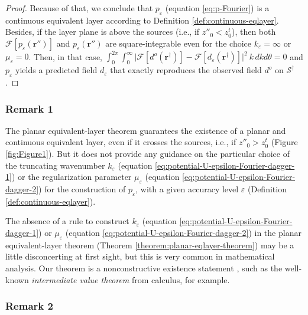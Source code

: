 \documentclass[manuscript,noblind]{geophysics}
\begin{document}
\begin{proof}
		Because of that, we conclude that $p_{\varepsilon}$ (equation \ref{eq:p-Fourier})
		is a continuous equivalent layer according to Definition \ref{def:continuous-eqlayer}. 
		Besides, if the layer plane is above the sources (i.e., if $z''_{0} < z^{t}_{0}$), then both 
		$\mathcal{F} [ p_{\varepsilon}(\mathbf{r}'') ]$ and $p_{\varepsilon}(\mathbf{r}'')$ are square-integrable
		even for the choice $k_{\varepsilon} = \infty$ or $\mu_{\varepsilon} = 0$. Then, in that case, 
		$\int_{0}^{2\pi} \int_{0}^{\infty} 
		\vert \mathcal{F} [ d^{o}(\mathbf{r}^{\dagger}) ] - \mathcal{F} [d_{\varepsilon}(\mathbf{r}^{\dagger}) ] \vert^{2} \: k \, dkd\theta 
		= 0$ and $p_{\varepsilon}$ yields a predicted field $d_{\varepsilon}$ that exactly reproduces the observed field $d^{o}$ 
		on $\mathcal{S}^{\dagger}$.
	\end{proof}
	
	\subsubsection{Remark 1}
	
	The planar equivalent-layer theorem guarantees the existence of a planar and continuous equivalent layer, even if
	it crosses the sources, i.e., if $z''_{0} > z^{t}_{0}$ (Figure \ref{fig:Figure1}).
	But it does not provide any guidance on the particular choice of the 
	truncating wavenumber $k_{\varepsilon}$ (equation \ref{eq:potential-U-epsilon-Fourier-dagger-1}) or the 
	regularization parameter $\mu_{\varepsilon}$ (equation \ref{eq:potential-U-epsilon-Fourier-dagger-2}) 
	for the construction of $p_{\varepsilon}$, with a given accuracy level 
	$\varepsilon$ (Definition \ref{def:continuous-eqlayer}).
	
	The absence of a rule to construct $k_{\varepsilon}$ (equation \ref{eq:potential-U-epsilon-Fourier-dagger-1}) or 
	$\mu_{\varepsilon}$ (equation \ref{eq:potential-U-epsilon-Fourier-dagger-2}) in the 
	planar equivalent-layer theorem (Theorem \ref{theorem:planar-eqlayer-theorem}) may be a little disconcerting 
	at first sight, but this is very common in mathematical analysis. 
	Our theorem is a nonconstructive existence statement \citep[e.g., ][ p. 200]{tao_2016}, such as the well-known
	\textit{intermediate value theorem} from calculus, for example.
	
	\subsubsection{Remark 2}
	
\end{document}
